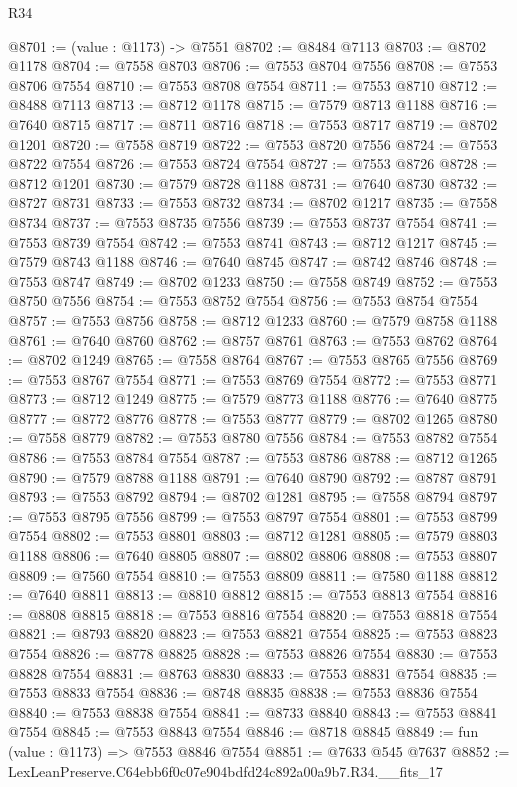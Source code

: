 \begin{lexlean}{R34}
\begin{coremodule}
@8701 := (value : @1173) -> @7551
@8702 := @8484 @7113
@8703 := @8702 @1178
@8704 := @7558 @8703
@8706 := @7553 @8704 @7556
@8708 := @7553 @8706 @7554
@8710 := @7553 @8708 @7554
@8711 := @7553 @8710
@8712 := @8488 @7113
@8713 := @8712 @1178
@8715 := @7579 @8713 @1188
@8716 := @7640 @8715
@8717 := @8711 @8716
@8718 := @7553 @8717
@8719 := @8702 @1201
@8720 := @7558 @8719
@8722 := @7553 @8720 @7556
@8724 := @7553 @8722 @7554
@8726 := @7553 @8724 @7554
@8727 := @7553 @8726
@8728 := @8712 @1201
@8730 := @7579 @8728 @1188
@8731 := @7640 @8730
@8732 := @8727 @8731
@8733 := @7553 @8732
@8734 := @8702 @1217
@8735 := @7558 @8734
@8737 := @7553 @8735 @7556
@8739 := @7553 @8737 @7554
@8741 := @7553 @8739 @7554
@8742 := @7553 @8741
@8743 := @8712 @1217
@8745 := @7579 @8743 @1188
@8746 := @7640 @8745
@8747 := @8742 @8746
@8748 := @7553 @8747
@8749 := @8702 @1233
@8750 := @7558 @8749
@8752 := @7553 @8750 @7556
@8754 := @7553 @8752 @7554
@8756 := @7553 @8754 @7554
@8757 := @7553 @8756
@8758 := @8712 @1233
@8760 := @7579 @8758 @1188
@8761 := @7640 @8760
@8762 := @8757 @8761
@8763 := @7553 @8762
@8764 := @8702 @1249
@8765 := @7558 @8764
@8767 := @7553 @8765 @7556
@8769 := @7553 @8767 @7554
@8771 := @7553 @8769 @7554
@8772 := @7553 @8771
@8773 := @8712 @1249
@8775 := @7579 @8773 @1188
@8776 := @7640 @8775
@8777 := @8772 @8776
@8778 := @7553 @8777
@8779 := @8702 @1265
@8780 := @7558 @8779
@8782 := @7553 @8780 @7556
@8784 := @7553 @8782 @7554
@8786 := @7553 @8784 @7554
@8787 := @7553 @8786
@8788 := @8712 @1265
@8790 := @7579 @8788 @1188
@8791 := @7640 @8790
@8792 := @8787 @8791
@8793 := @7553 @8792
@8794 := @8702 @1281
@8795 := @7558 @8794
@8797 := @7553 @8795 @7556
@8799 := @7553 @8797 @7554
@8801 := @7553 @8799 @7554
@8802 := @7553 @8801
@8803 := @8712 @1281
@8805 := @7579 @8803 @1188
@8806 := @7640 @8805
@8807 := @8802 @8806
@8808 := @7553 @8807
@8809 := @7560 @7554
@8810 := @7553 @8809
@8811 := @7580 @1188
@8812 := @7640 @8811
@8813 := @8810 @8812
@8815 := @7553 @8813 @7554
@8816 := @8808 @8815
@8818 := @7553 @8816 @7554
@8820 := @7553 @8818 @7554
@8821 := @8793 @8820
@8823 := @7553 @8821 @7554
@8825 := @7553 @8823 @7554
@8826 := @8778 @8825
@8828 := @7553 @8826 @7554
@8830 := @7553 @8828 @7554
@8831 := @8763 @8830
@8833 := @7553 @8831 @7554
@8835 := @7553 @8833 @7554
@8836 := @8748 @8835
@8838 := @7553 @8836 @7554
@8840 := @7553 @8838 @7554
@8841 := @8733 @8840
@8843 := @7553 @8841 @7554
@8845 := @7553 @8843 @7554
@8846 := @8718 @8845
@8849 := fun (value : @1173) => @7553 @8846 @7554
@8851 := @7633 @545 @7637
@8852 := LexLeanPreserve.C64ebb6f0c07e904bdfd24c892a00a9b7.R34.__fits_17

\end{coremodule}
\end{lexlean}
